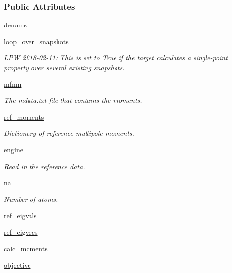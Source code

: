 \subsubsection*{Public Attributes}
\begin{DoxyCompactItemize}
\item 
\hyperlink{classsrc_1_1moments_1_1Moments_a6653db1a4be8eeea6fd2c96e78fd2b01}{denoms}
\item 
\hyperlink{classsrc_1_1moments_1_1Moments_a39ad9d5899f0865d6776c0319021add6}{loop\+\_\+over\+\_\+snapshots}
\begin{DoxyCompactList}\small\item\em L\+PW 2018-\/02-\/11\+: This is set to True if the target calculates a single-\/point property over several existing snapshots. \end{DoxyCompactList}\item 
\hyperlink{classsrc_1_1moments_1_1Moments_abfe7bfc989f78323b9fecd71292b8b57}{mfnm}
\begin{DoxyCompactList}\small\item\em The mdata.\+txt file that contains the moments. \end{DoxyCompactList}\item 
\hyperlink{classsrc_1_1moments_1_1Moments_a5df511eabdedb11fb6302bfb6efe0332}{ref\+\_\+moments}
\begin{DoxyCompactList}\small\item\em Dictionary of reference multipole moments. \end{DoxyCompactList}\item 
\hyperlink{classsrc_1_1moments_1_1Moments_ae3486cce343d676ffabf9c0f0f2bd7ca}{engine}
\begin{DoxyCompactList}\small\item\em Read in the reference data. \end{DoxyCompactList}\item 
\hyperlink{classsrc_1_1moments_1_1Moments_a5c0ccb084bf420546b9d5fb7c0981732}{na}
\begin{DoxyCompactList}\small\item\em Number of atoms. \end{DoxyCompactList}\item 
\hyperlink{classsrc_1_1moments_1_1Moments_aff18e7be56567cb922f0d4677ae30253}{ref\+\_\+eigvals}
\item 
\hyperlink{classsrc_1_1moments_1_1Moments_aade44568e6eff2bc201eb75dc0b9f188}{ref\+\_\+eigvecs}
\item 
\hyperlink{classsrc_1_1moments_1_1Moments_adb3b92e1b5ae0a0debe08195a141623f}{calc\+\_\+moments}
\item 
\hyperlink{classsrc_1_1moments_1_1Moments_affeb4f69b09900393e42829a349d735f}{objective}
\end{DoxyCompactItemize}


